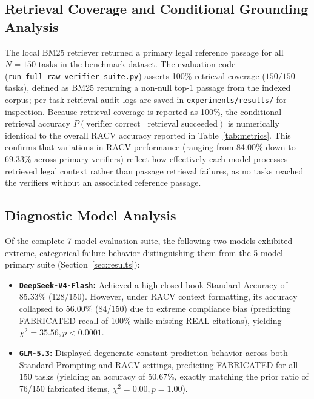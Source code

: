 \documentclass[conference]{IEEEtran}
\begin{document}
\subsection{Retrieval Coverage and Conditional Grounding Analysis}
The local BM25 retriever returned a primary legal reference passage for all $N=150$ tasks in the benchmark dataset. The evaluation code (\texttt{run\_full\_raw\_verifier\_suite.py}) asserts 100\% retrieval coverage ($150/150$ tasks), defined as BM25 returning a non-null top-1 passage from the indexed corpus; per-task retrieval audit logs are saved in \texttt{experiments/results/} for inspection. Because retrieval coverage is reported as 100\%, the conditional retrieval accuracy $P(\text{verifier correct} \mid \text{retrieval succeeded})$ is numerically identical to the overall RACV accuracy reported in Table~\ref{tab:metrics}. This confirms that variations in RACV performance (ranging from 84.00\% down to 69.33\% across primary verifiers) reflect how effectively each model processes retrieved legal context rather than passage retrieval failures, as no tasks reached the verifiers without an associated reference passage.

\subsection{Diagnostic Model Analysis}
\label{sec:diagnostic}
Of the complete 7-model evaluation suite, the following two models exhibited extreme, categorical failure behavior distinguishing them from the 5-model primary suite (Section~\ref{sec:results}):
\begin{itemize}
\item \textbf{\texttt{DeepSeek-V4-Flash}:} Achieved a high closed-book Standard Accuracy of 85.33\% (128/150). However, under RACV context formatting, its accuracy collapsed to 56.00\% (84/150) due to extreme compliance bias (predicting FABRICATED recall of 100\% while missing REAL citations), yielding $\chi^2 = 35.56, p < 0.0001$.
\item \textbf{\texttt{GLM-5.3}:} Displayed degenerate constant-prediction behavior across both Standard Prompting and RACV settings, predicting FABRICATED for all 150 tasks (yielding an accuracy of 50.67\%, exactly matching the prior ratio of 76/150 fabricated items, $\chi^2 = 0.00, p = 1.00$).
\end{itemize}
\end{document}
